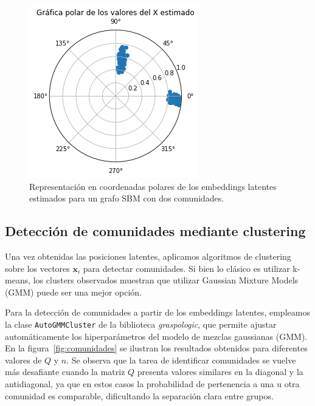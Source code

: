 \documentclass{article}
\begin{document}
\begin{figure}[htb]
    \centering
    \includegraphics[width=0.7\linewidth]{images/coordenadas_polares.png}
    \caption{Representación en coordenadas polares de los embeddings latentes estimados para un grafo SBM con dos comunidades.}
    \label{fig:coordenadas polares}
\end{figure}


\subsection{Detección de comunidades mediante clustering}

Una vez obtenidas las posiciones latentes, aplicamos algoritmos de clustering sobre los vectores $\mathbf{x}_i$ para detectar comunidades. Si bien lo clásico es utilizar k-means, los clusters observados muestran que utilizar Gaussian Mixture Models (GMM) puede ser una mejor opción.

Para la detección de comunidades a partir de los embeddings latentes, empleamos la clase \verb|AutoGMMCluster| de la biblioteca \textit{graspologic}, que permite ajustar automáticamente los hiperparámetros del modelo de mezclas gaussianas (GMM). En la figura~\ref{fig:comunidades} se ilustran los resultados obtenidos para diferentes valores de $Q$ y $n$. Se observa que la tarea de identificar comunidades se vuelve más desafiante cuando la matriz $Q$ presenta valores similares en la diagonal y la antidiagonal, ya que en estos casos la probabilidad de pertenencia a una u otra comunidad es comparable, dificultando la separación clara entre grupos.
\end{document}
